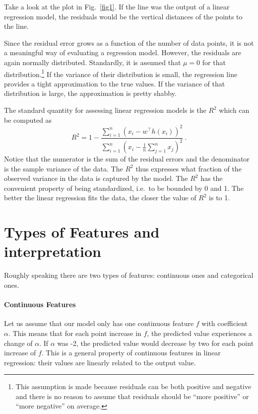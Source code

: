 \documentclass[11pt, leqno, a4paper]{article}
\begin{document}
Take a look at the plot in Fig.~\ref{fig1}. If the line was the output of a linear 
regression model, the residuals would be the vertical distances of the points to the line.

Since the residual error grows as a function of the number of data points, it is not a meaningful
way of evaluating a regression model. However, the residuals are again normally distributed. Standardly,
it is assumed that $ \mu=0 $ for that distribution.\footnote{This assumption is made because
residuals can be both positive and negative and there is no reason to assume that residuals should
be ``more positive'' or ``more negative'' on average.} If the
variance of their distribution is small, the regression line provides a tight approximation to the
true values. If the variance of that distribution is large, the approximation is pretty shabby. 

The standard quantity for assessing linear regression models is the 
\href{https://en.wikipedia.org/wiki/Coefficient_of_determination}{$ R^{2} $} which can be computed as
\begin{equation}
R^{2} = 1 - \frac{\sum_{i=1}^{n} \left( x_{i} - w^{\top}h(x_{i}) \right)^{2}}
{\sum_{i=1}^{n} \left(x_{i} - \frac{1}{n}\sum_{j = 1}^{n}x_{j}\right)^{2}} \ .
\end{equation}
Notice that the numerator is the sum of the residual errors 
and the denominator is the sample variance of the data.
The $ R^{2} $ thus expresses what fraction of the observed variance in the data is captured by the model. The 
$ R^{2} $ has the convenient property of being standardized, i.e.\ to
be bounded by 0 and 1. The better the linear regression fits the data,
the closer the value of $R^2$ is to 1.


\section{Types of Features and interpretation}

Roughly speaking there are two types of features: continuous ones and categorical ones.

\paragraph{Continuous Features} Let us assume that our model only has one continuous feature $ f $ 
with coefficient $ \alpha $. This means that for each point increase in $ f $, the predicted value
experiences a change of $ \alpha $. If $ \alpha $ was -2, the predicted value would decrease by two
for each point increase of $ f $. This is a general property of continuous features in linear
regression: their values are linearly related to the output value.
\end{document}
